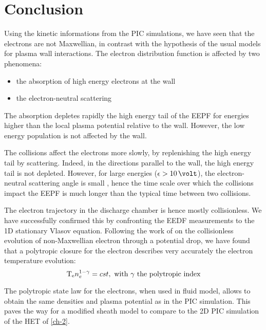 
\section{Conclusion }
\label{sec-ch3conclusion}

Using the kinetic informations from the \ac{PIC} simulations, we have seen that the electrons are not Maxwellian, in contrast with the hypothesis of the usual models for plasma wall interactions.
The electron distribution function is affected by two phenomena\string:
\begin{itemize}
  \item the absorption of high energy electrons at the wall
  \item the electron-neutral scattering
\end{itemize}
\vspace{1em}
The absorption depletes rapidly the high energy tail of the EEPF for energies higher than the local plasma potential relative to the wall.
However, the low energy population is not affected by the wall.

The collisions affect the electrons more slowly, by replenishing the high energy tail by scattering.
Indeed, in the directions parallel to the wall, the high energy tail is not depleted.
However, for large energies ($\ek > 10\,\volt$), the electron-neutral scattering angle is small \citep{vahedi1995}, hence the time scale over which the collisions impact the EEPF is much longer than the typical time between two collisions.

The electron trajectory in the discharge chamber is hence mostly collisionless.
We have successfully confirmed this by confronting the EEDF measurements to the 1D stationary Vlasov equation.
Following the work of \citet{zhang2016} on the collisionless evolution of non-Maxwellian electron through a potential drop, we have found that a polytropic closure for the electron describes very accurately the electron temperature evolution\string:
\begin{equation*} \label{eq-polyp2}
  \mathrm{T_e} n_e^{1-\gamma} = cst, \text{ with $\gamma$ the polytropic index}
\end{equation*}

The polytropic state law for the electrons, when used in fluid model, allows to obtain the same densities and plasma potential as in the \ac{PIC} simulation.
This paves the way for a modified sheath model to compare to the \ac{2D} \ac{PIC} simulation of the \ac{HET} of \cref{ch-2}.

